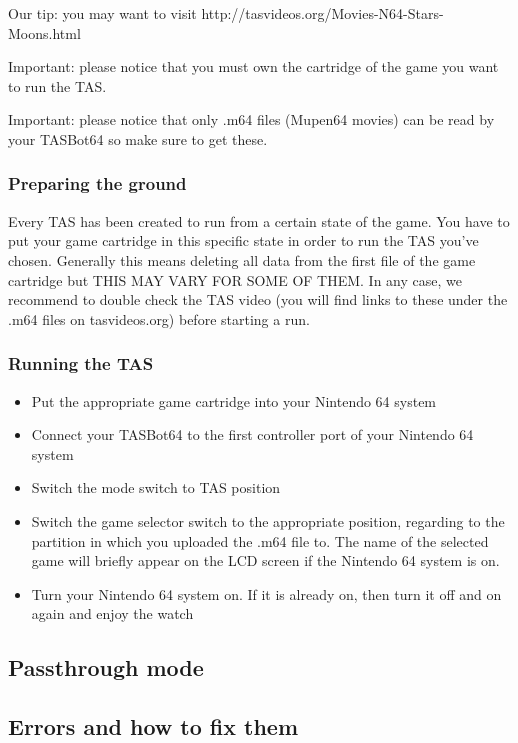 \documentclass[a4paper,oneside,12pt]{article}
\begin{document}
Our tip: you may want to visit http://tasvideos.org/Movies-N64-Stars-Moons.html

Important: please notice that you must own the cartridge of the game you want to
run the TAS.

Important: please notice that only .m64 files (Mupen64 movies) can be read by
your TASBot64 so make sure to get these.

\subsubsection{Preparing the ground}
Every TAS has been created to run from a certain state of the game. You have to
put your game cartridge in this specific state in order to run the TAS you've
chosen. Generally this means deleting all data from the first file of the game
cartridge but THIS MAY VARY FOR SOME OF THEM. In any case, we recommend to
double check the TAS video (you will find links to these under the .m64 files on
tasvideos.org) before starting a run.

\subsubsection{Running the TAS}
\begin{itemize}
\item Put the appropriate game cartridge into your Nintendo 64 system
\item Connect your TASBot64 to the first controller port of your Nintendo 64
system
\item Switch the mode switch to TAS position
\item Switch the game selector switch to the appropriate position, regarding to
the partition in which you uploaded the .m64 file to. The name of the selected
game will briefly appear on the LCD screen if the Nintendo 64 system is on.
\item Turn your Nintendo 64 system on. If it is already on, then turn it off and
on again and enjoy the watch
\end{itemize}

\subsection{Passthrough mode}

\subsection{Errors and how to fix them}
\end{document}
